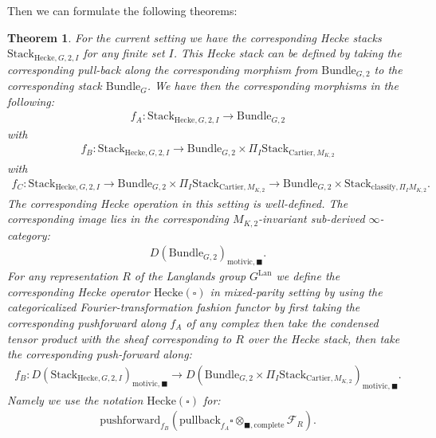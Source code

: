 \documentclass[12pt]{book}
\newtheorem{theorem}{Theorem}
\theoremstyle{definition}
\begin{document}
\indent Then we can formulate the following theorems:
\begin{theorem}
For the current setting we have the corresponding Hecke stacks $\mathrm{Stack}_{\mathrm{Hecke},G,2,I}$ for any finite set $I$. This Hecke stack can be defined by taking the corresponding pull-back along the corresponding morphism from $\mathrm{Bundle}_{G,2}$ to the corresponding stack $\mathrm{Bundle}_{G}$. We have then the corresponding morphisms in the following:
\begin{align}
f_A: \mathrm{Stack}_{\mathrm{Hecke},G,2,I} \rightarrow \mathrm{Bundle}_{G,2}
\end{align}
with
\begin{align}
f_B: \mathrm{Stack}_{\mathrm{Hecke},G,2,I} \rightarrow \mathrm{Bundle}_{G,2}\times \Pi_I \mathrm{Stack}_{\mathrm{Cartier},M_{K,2}}
\end{align}
with
\begin{align}
f_C: \mathrm{Stack}_{\mathrm{Hecke},G,2,I} \rightarrow \mathrm{Bundle}_{G,2}\times\Pi_I  \mathrm{Stack}_{\mathrm{Cartier},M_{K,2}}\rightarrow \mathrm{Bundle}_{G,2}\times \mathrm{Stack}_{\mathrm{classify},\Pi_I M_{K,2}}.
\end{align}
The corresponding Hecke operation in this setting is well-defined. The corresponding image lies in the corresponding $M_{K,2}$-invariant sub-derived $\infty$-category:
\begin{align}
D(\mathrm{Bundle}_{G,2})_{\text{motivic},\blacksquare}.
\end{align}
For any representation $R$ of the Langlands group $G^\mathrm{Lan}$ we define the corresponding Hecke operator $\mathrm{Hecke}(\square)$ in mixed-parity setting by using the categoricalized Fourier-transformation fashion functor by first taking the corresponding pushforward along $f_A$ of any complex then take the condensed tensor product with the sheaf corresponding to $R$ over the Hecke stack, then take the corresponding push-forward along:
\begin{align}
f_B: D(\mathrm{Stack}_{\mathrm{Hecke},G,2,I})_{\text{motivic},\blacksquare} \rightarrow D(\mathrm{Bundle}_{G,2}\times \Pi_I \mathrm{Stack}_{\mathrm{Cartier},M_{K,2}})_{\text{motivic},\blacksquare}.
\end{align}
Namely we use the notation $\mathrm{Hecke}(\square)$ for:
\begin{align}
\mathrm{pushforward}_{f_B}(\mathrm{pullback}_{f_A}\square\otimes_{\blacksquare,\mathrm{complete}}\mathcal{F}_R).
\end{align}
\end{theorem}
\end{document}
